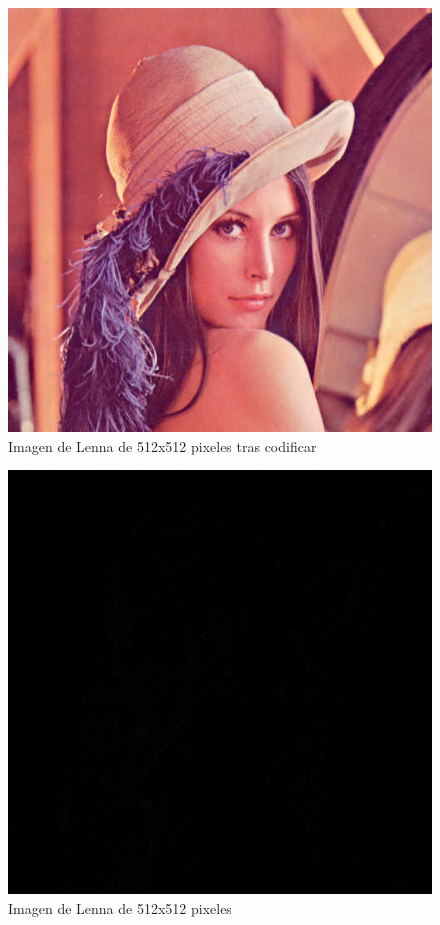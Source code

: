 \documentclass[%
	final,
	reprint,
	notitlepage,
	narroweqnarray,
	inline,
	twoside,
	invited
	]{ieee}
\begin{document}
\begin{thebibliography}{1}
\begin{figure}[H]
\centering
	\includegraphics[scale=0.7]{./img/lenaout.tiff}
	\caption{Imagen de Lenna de 512x512 pixeles tras codificar}
\end{figure}

\begin{figure}[H]
\centering
	\includegraphics[scale=0.7]{./img/lenadif.tiff}
	\caption{Imagen de Lenna de 512x512 pixeles}
\end{figure}


\end{thebibliography}
\end{document}
